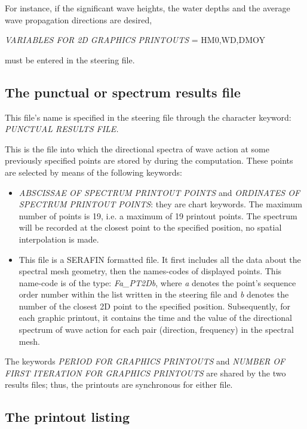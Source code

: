  For instance, if the significant wave heights, the water depths and the average wave propagation directions are desired,

 \textit{VARIABLES FOR 2D GRAPHICS PRINTOUTS }= HM0,WD,DMOY

 must be entered in the steering file.


\subsection{ The punctual or spectrum results file}

 This file's name is specified in the steering file through the character keyword: \textit{PUNCTUAL RESULTS FILE.}

 This is the file into which the directional spectra of wave action at some previously specified points are stored by \tomawac during the computation. These points are selected by means of the following keywords:

\begin{itemize}
\item  \textit{ABSCISSAE OF SPECTRUM PRINTOUT POINTS} and \textit{ORDINATES OF SPECTRUM PRINTOUT POINTS}: they are chart keywords. The maximum number of points is 19, i.e. a maximum of 19 printout points. The spectrum will be recorded at the closest point to the specified position, no spatial interpolation is made.

\item  This file is a SERAFIN formatted file. It first includes all the data about the spectral mesh geometry, then the names-codes of displayed points. This name-code is of the type: \textit{Fa\_PT2Db}, where \textit{a }denotes the point's sequence order number within the list written in the steering file and \textit{b} denotes the number of the closest 2D point to the specified position. Subsequently, for each graphic printout, it contains the time and the value of the directional spectrum of wave action for each pair (direction, frequency) in the spectral mesh.
\end{itemize}

 The keywords \textit{PERIOD FOR GRAPHICS PRINTOUTS }and \textit{NUMBER OF FIRST ITERATION FOR GRAPHICS PRINTOUTS} are shared by the two results files; thus, the printouts are synchronous for either file.


\subsection{ The printout listing}

